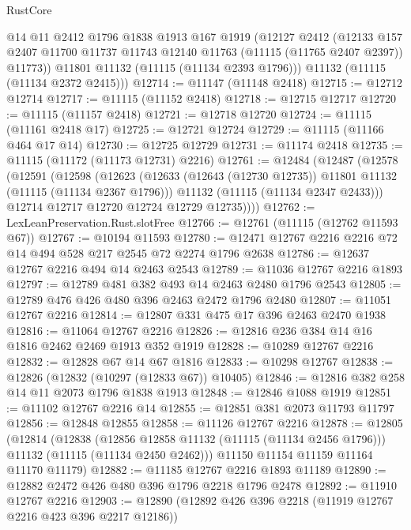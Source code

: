 \begin{lexlean}{RustCore}
\begin{coremodule}
        @14
        @11
        @2412
        @1796
        @1838
        @1913
        @167
        @1919
        (@12127
          @2412
          (@12133
            @157
            @2407
            @11700
            @11737
            @11743
            @12140
            @11763
            (@11115 (@11765 @2407 @2397))
            @11773))
        @11801
        @11132
        (@11115 (@11134 @2393 @1796)))
      @11132
      (@11115 (@11134 @2372 @2415)))
@12714 := @11147 (@11148 @2418)
@12715 := @12712 @12714
@12717 := @11115 (@11152 @2418)
@12718 := @12715 @12717
@12720 := @11115 (@11157 @2418)
@12721 := @12718 @12720
@12724 := @11115 (@11161 @2418 @17)
@12725 := @12721 @12724
@12729 := @11115 (@11166 @464 @17 @14)
@12730 := @12725 @12729
@12731 := @11174 @2418
@12735 := @11115 (@11172 (@11173 @12731) @2216)
@12761 := @12484
    (@12487
      (@12578
        (@12591
          (@12598
            (@12623
              (@12633 (@12643 (@12730 @12735)) @11801 @11132 (@11115 (@11134 @2367 @1796)))
              @11132
              (@11115 (@11134 @2347 @2433)))
            @12714
            @12717
            @12720
            @12724
            @12729
            @12735))))
@12762 := LexLeanPreservation.Rust.slotFree
@12766 := @12761 (@11115 (@12762 @11593 @67))
@12767 := @10194 @11593
@12780 := @12471 @12767 @2216 @2216 @72 @14 @494 @528 @217 @2545 @72 @2274 @1796 @2638
@12786 := @12637 @12767 @2216 @494 @14 @2463 @2543
@12789 := @11036 @12767 @2216 @1893
@12797 := @12789 @481 @382 @493 @14 @2463 @2480 @1796 @2543
@12805 := @12789 @476 @426 @480 @396 @2463 @2472 @1796 @2480
@12807 := @11051 @12767 @2216
@12814 := @12807 @331 @475 @17 @396 @2463 @2470 @1938
@12816 := @11064 @12767 @2216
@12826 := @12816 @236 @384 @14 @16 @1816 @2462 @2469 @1913 @352 @1919
@12828 := @10289 @12767 @2216
@12832 := @12828 @67 @14 @67 @1816
@12833 := @10298 @12767
@12838 := @12826 (@12832 (@10297 (@12833 @67)) @10405)
@12846 := @12816 @382 @258 @14 @11 @2073 @1796 @1838 @1913
@12848 := @12846 @1088 @1919
@12851 := @11102 @12767 @2216 @14
@12855 := @12851 @381 @2073 @11793 @11797
@12856 := @12848 @12855
@12858 := @11126 @12767 @2216
@12878 := @12805
    (@12814
      (@12838
        (@12856 @12858 @11132 (@11115 (@11134 @2456 @1796)))
        @11132
        (@11115 (@11134 @2450 @2462)))
      @11150
      @11154
      @11159
      @11164
      @11170
      @11179)
@12882 := @11185 @12767 @2216 @1893 @11189
@12890 := @12882 @2472 @426 @480 @396 @1796 @2218 @1796 @2478
@12892 := @11910 @12767 @2216
@12903 := @12890 (@12892 @426 @396 @2218 (@11919 @12767 @2216 @423 @396 @2217 @12186))

\end{coremodule}
\end{lexlean}
